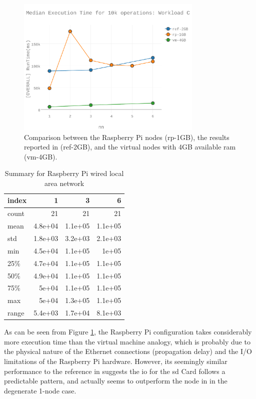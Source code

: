 \begin{figure}[h]
\includegraphics[width=3.5in]{Figures/figures-wlc_fig6.pdf}

\caption{Comparison between the Raspberry Pi nodes (rp-1GB), the results reported in \cite{Abramova2014} (ref-2GB), and the virtual nodes with 4GB available \gls{ram} (vm-4GB).}

\label{fig:fig06}
\end{figure}

\begin{table}
\begin{tabular}{lrrr}
\toprule
 index &       1 &       3 &       6 \\
\midrule
 count &      21 &      21 &      21 \\
  mean & 4.8e+04 & 1.1e+05 & 1.1e+05 \\
   std & 1.8e+03 & 3.2e+03 & 2.1e+03 \\
   min & 4.5e+04 & 1.1e+05 &   1e+05 \\
   25\% & 4.7e+04 & 1.1e+05 & 1.1e+05 \\
   50\% & 4.9e+04 & 1.1e+05 & 1.1e+05 \\
   75\% &   5e+04 & 1.1e+05 & 1.1e+05 \\
   max &   5e+04 & 1.3e+05 & 1.1e+05 \\
 range & 5.4e+03 & 1.7e+04 & 8.1e+03 \\
\bottomrule
\end{tabular}
\caption{Summary for Raspberry Pi wired local area network}
\label{table:rp_wired_summary_statistics}
\end{table}

As can be seen from Figure \ref{fig:fig06}, the Raspberry Pi configuration takes considerably more execution time than the virtual machine analogy, which is probably due to the physical nature of the Ethernet connections (propagation delay) and the I/O limitations of the Raspberry Pi hardware.  However, its seemingly similar performance to the reference in \cite{Abramova2014} suggests the \gls{io} for the \gls{sd} Card follows a predictable pattern, and actually seems to outperform the node in \cite{Abramova2014} in the degenerate 1-node case.

